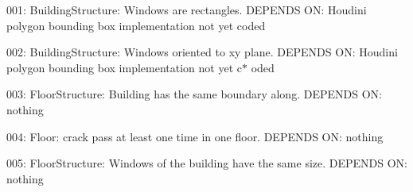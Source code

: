 001\-: Building\-Structure\-: Windows are rectangles. D\-E\-P\-E\-N\-D\-S O\-N\-: Houdini polygon bounding box implementation not yet coded

002\-: Building\-Structure\-: Windows oriented to xy plane. D\-E\-P\-E\-N\-D\-S O\-N\-: Houdini polygon bounding box implementation not yet c$\ast$ oded

003\-: Floor\-Structure\-: Building has the same boundary along. D\-E\-P\-E\-N\-D\-S O\-N\-: nothing

004\-: Floor\-: crack pass at least one time in one floor. D\-E\-P\-E\-N\-D\-S O\-N\-: nothing

005\-: Floor\-Structure\-: Windows of the building have the same size. D\-E\-P\-E\-N\-D\-S O\-N\-: nothing 